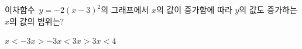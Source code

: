 이차함수~$y=-2(x-3)^2$의 그래프에서 $x$의 값이 증가함에 따라 $y$의 값도 증가하는 $x$의 값의 범위는?
\begin{choices32}{$x<-3$}{$x>-3$}{$x<3$}{$x>3$}{$x<4$}\end{choices32}
